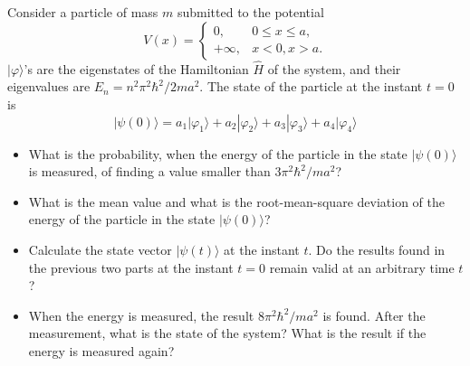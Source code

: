 \documentclass[12pt,a4paper]{article}
\newenvironment{problem}[2][Problem]{\begin{trivlist}
\item[\hskip \labelsep {\bfseries #1}\hskip \labelsep {\bfseries #2.}]}{\end{trivlist}}
\begin{document}
\begin{problem}{2}
[C-T Exercise 3-12] Consider a particle of mass $m$ submitted to the potential
\[
V(x)=\left\{\begin{array}{ll}
0,&0\leq x\leq a,\\
+\infty,&x<0,x>a.
\end{array}\right.
\]
$|\varphi\rangle$'s are the eigenstates of the Hamiltonian $\hat{H}$ of the system, and their eigenvalues are $E_n=n^2\pi^2\hbar^2/2ma^2$. The state of the particle at the instant $t=0$ is
\[
|\psi(0)\rangle=a_1|\varphi_1\rangle+a_2|\varphi_2\rangle+a_3|\varphi_3\rangle+a_4|\varphi_4\rangle
\]
\begin{itemize}
\item[(a)] What is the probability, when the energy of the particle in the state $|\psi(0)\rangle$ is measured, of finding a value smaller than $3\pi^2\hbar^2/ma^2$?
\item[(b)] What is the mean value and what is the root-mean-square deviation of the energy of the particle in the state $|\psi(0)\rangle$?
\item[(c)] Calculate the state vector $|\psi(t)\rangle$ at the instant $t$. Do the results found in the previous two parts at the instant $t=0$ remain valid at an arbitrary time $t$?
\item[(d)] When the energy is measured, the result $8\pi^2\hbar^2/ma^2$ is found. After the measurement, what is the state of the system? What is the result if the energy is measured again?
\end{itemize}
\end{problem}
\end{document}

